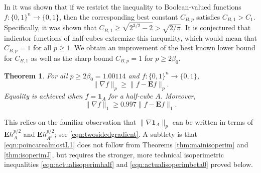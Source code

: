 \documentclass[12pt]{amsart}
\theoremstyle{plain}
\newtheorem{thm}{Theorem}[section]
\theoremstyle{definition}
\theoremstyle{remark}
\numberwithin{equation}{section}
\begin{document}
In \cite{BIM23} it was shown that if we restrict the inequality to Boolean-valued functions $f:\{0,1\}^n\to \{0,1\}$, then 
 the corresponding best constant $C_{B,p}$ 
satisfies $C_{B,1} >C_1$. Specifically, it was shown that $C_{B,1}\ge \sqrt{2^{3/2}-2}>\sqrt{2/\pi}$.
It is conjectured that indicator functions of half-cubes extremize this inequality, which would mean that $C_{B,p}=1$ for all $p\ge 1$.
We obtain an improvement of the best known lower bound for $C_{B,1}$ as well as the sharp bound $C_{B,p} =1$ for $p\geq 2\beta_0$.
\begin{thm}\label{thm:poincare} For all $p\geq 2\beta_0= 1.00114$ and $f:\{0,1\}^n\to \{0,1\}$,
\begin{equation}\label{eqn:poincarealmostL1}
\|\nabla f\|_p\ge \|f-\mathbf{E}f\|_p. 
\end{equation}
Equality is achieved when $f=\mathbf{1}_A$ for a half-cube $A$. 
Moreover, 
\[ \|\nabla f\|_1\ge 0.997 \|f-\mathbf{E}f\|_1. \]
 \end{thm}
This relies on the familiar observation that $\|\nabla \mathbf{1}_A\|_p$ can be written in terms of $\mathbf{E} h_A^{p/2}$ and $\mathbf{E} h_{A^c}^{p/2}$; see \eqref{eqn:twosidedgradient}.
A subtlety is that \eqref{eqn:poincarealmostL1}  does not follow from Theorems \ref{thm:mainisoperim} and \ref{thm:isoperimJ}, but requires the stronger, more technical isoperimetric inequalities \eqref{eqn:actualisoperimhalf} and \eqref{eqn:actualisoperimbeta0} proved below.
\end{document}
